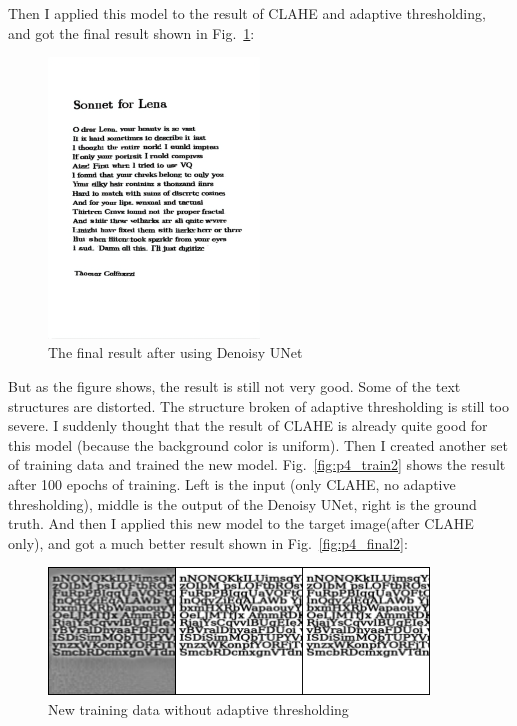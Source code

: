 \documentclass[12pt,a4paper]{article}
\begin{document}
\begin{enumerate}
    Then I applied this model to the result of CLAHE and adaptive thresholding, and got the final result shown in Fig.~\ref{fig:p4_final}:
    \begin{figure}[H]
        \centering
        \includegraphics[width=0.5\textwidth]{src/img/p4_final.png}
        \caption{The final result after using Denoisy UNet}
        \label{fig:p4_final}
    \end{figure}
    \newpage
    But as the figure shows, the result is still not very good. Some of the text structures are distorted. The structure broken of adaptive thresholding is still too severe. I suddenly thought that the result of CLAHE is already quite good for this model (because the background color is uniform). Then I created another set of training data and trained the new model. Fig.~\ref{fig:p4_train2} shows the result after 100 epochs of training. Left is the input (only CLAHE, no adaptive thresholding), middle is the output of the Denoisy UNet, right is the ground truth. And then I applied this new model to the target image(after CLAHE only), and got a much better result shown in Fig.~\ref{fig:p4_final2}:
    \begin{figure}
        \centering
        \includegraphics[width=0.9\textwidth]{src/img/train_nobi.png}
        \caption{New training data without adaptive thresholding}

\end{figure}
\end{enumerate}
\end{document}
